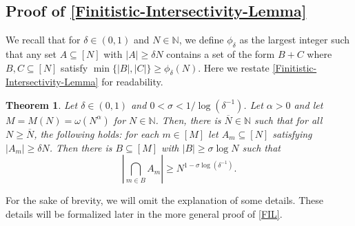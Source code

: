 \documentclass[letter, 11pt]{article}
\theoremstyle{plain} %
\newtheorem{theorem}{Theorem}[section]
\theoremstyle{definition} %
\theoremstyle{plain}
\theoremstyle{plain}
\newcommand{\N}{\mathbb{N}}
\newcommand{\1}{\mathbbm{1}}
\begin{document}
\subsection{Proof of \cref{Finitistic-Intersectivity-Lemma}}
We recall that for $\delta \in (0,1)$ and $N\in \N$, we define $\phi_{\delta}$ as the largest integer such that any set $A \subseteq [N]$ with $|A| \geq \delta N$ contains a set of the form $B+C$ where $B,C \subseteq [N]$ satisfy $\min\{|B|,|C|\} \geq \phi_{\delta}(N)$. Here we restate \cref{Finitistic-Intersectivity-Lemma} for readability.
\begingroup
\def\thetheorem{\ref{Finitistic-Intersectivity-Lemma}}
\begin{theorem}
       Let $\delta\in (0,1)$ and $0<\sigma<1/\log{(\delta^{-1})}$. Let $\alpha>0$ and let $M=M(N) =\omega(N^\alpha)$ for $N\in \N$. Then, there is $\overline{N}\in \N$ such that for all $N\geq \overline{N}$, the following holds: for each $m\in [M]$ let $A_{m}\subseteq [N]$ satisfying $|A_{m}|\geq \delta N$. Then there is $B\subseteq [M] $ with $|B|\geq \sigma \log{N}$ such that 
        $$\left| \bigcap_{m\in B} A_{m} \right| \geq N^{1-\sigma \log(\delta^{-1})}.$$
\end{theorem}
\addtocounter{theorem}{-1} %
\endgroup
For the sake of brevity, we will omit the explanation of some details. These details will be formalized later in the more general proof of \cref{FIL}.
\end{document}
